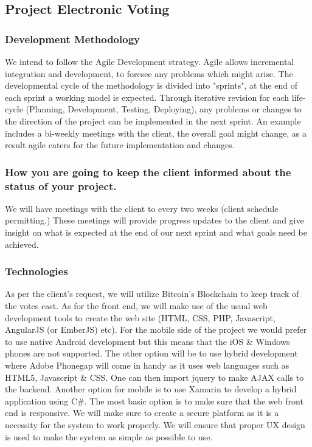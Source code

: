 \documentclass{article}
\begin{document}
	\subsection{Project Electronic Voting}
	\subsubsection{Development Methodology}
	We intend to follow the Agile Development strategy. Agile allows incremental integration and development, to foresee any problems which might arise. The developmental cycle of the methodology is divided into "sprints", at the end of each sprint a working model is expected. Through iterative revision for each life-cycle (Planning, Development, Testing, Deploying), any problems or changes to the direction of the project can be implemented in the next sprint. An example includes a bi-weekly meetings with the client, the overall goal might change, as a result agile caters for the future implementation and changes.
	
	\subsubsection{How you are going to keep the client informed about the status of your project.}
	 We will have meetings with the client to every two weeks (client schedule permitting.) These meetings will provide progress updates to the client and give insight on what is expected at the end of our next sprint and what goals need be achieved. 
	
	\subsubsection{Technologies}
	 As per the client's request, we will utilize Bitcoin's Blockchain to keep track of the votes cast. As for the front end, we will make use of the usual web development tools to create the web site (HTML, CSS, PHP, Javascript, AngularJS (or EmberJS) etc). For the mobile side of the project we would prefer to use native Android development but this means that the iOS \& Windows phones are not supported. The other option will be to use hybrid development where Adobe Phonegap will come in handy as it uses web languages such as HTML5, Javascript \& CSS. One can then import jquery to make AJAX calls to the backend. Another option for mobile is to use Xamarin to develop a hybrid application using C#. The most basic option is to make sure that the web front end is responsive. We will make sure to create a secure platform as it is a necessity for the system to work properly. We will ensure that proper UX design is used to make the system as simple as possible to use.
	
\end{document}

